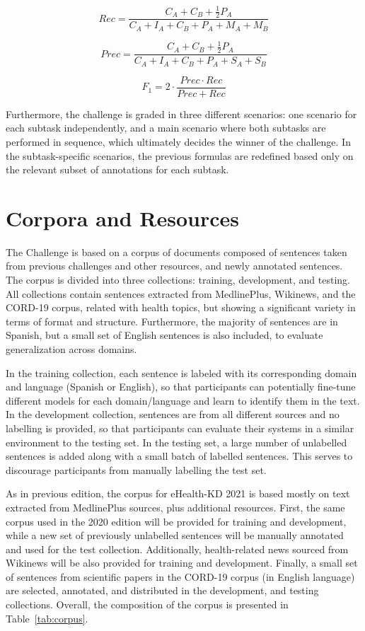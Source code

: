 \documentclass[a4paper,11pt,twocolumn,twoside]{article}
\begin{document}
$$Rec = \frac{C_A + C_B + \frac{1}{2} P_A}{C_A + I_A + C_B + P_A + M_A + M_B}$$

$$Prec = \frac{C_A + C_B + \frac{1}{2} P_A}{C_A + I_A + C_B + P_A + S_A + S_B}$$

$$F_1 = 2 \cdot \frac{Prec \cdot Rec}{Prec + Rec}$$

Furthermore, the challenge is graded in three different scenarios:
one scenario for each subtask independently, and a main scenario where both subtasks are performed in sequence, which ultimately decides the winner of the challenge.
In the subtask-specific scenarios, the previous formulas are redefined based only on the relevant subset of annotations for each subtask.

\section{Corpora and Resources}\label{sec:resources}

The Challenge is based on a corpus of documents composed of
sentences taken from previous challenges and other resources,
and newly annotated sentences.
The corpus is divided into three collections: training, development, and testing.
All collections contain sentences extracted from MedlinePlus, Wikinews, and the CORD-19 corpus, related with health topics, but showing a significant variety in terms of format and structure.
Furthermore, the majority of sentences are in Spanish, but a small set of English sentences is also included, to evaluate generalization across domains.

In the training collection, each sentence is labeled with its corresponding domain and language (Spanish or English), so that participants can potentially fine-tune different models for each domain/language and learn to identify them in the text.
In the development collection, sentences are from all different sources and no labelling is provided, so that participants can evaluate their systems in a similar environment to the testing set.
In the testing set, a large number of unlabelled sentences is added along with a small batch of labelled sentences. This serves to discourage participants from manually labelling the test set.

As in previous edition, the corpus for eHealth-KD 2021 is based mostly on text extracted from MedlinePlus sources, plus additional resources.
First, the same corpus used in the 2020 edition will be provided for training and development, while a new set of previously unlabelled sentences will be manually annotated and used for the test collection. Additionally, health-related news sourced from Wikinews will be also provided for training and development.
Finally, a small set of sentences from scientific papers in the CORD-19 corpus (in English language) are selected, annotated, and distributed in the development, and testing collections. Overall, the composition of the corpus is presented in Table~\ref{tab:corpus}.
\end{document}
